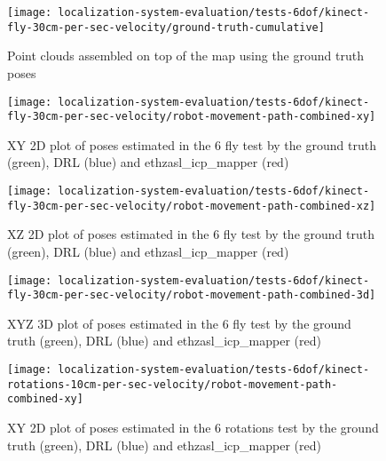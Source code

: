\begin{figure}[H]
	\centering
	\texttt{[image: localization-system-evaluation/tests-6dof/kinect-fly-30cm-per-sec-velocity/ground-truth-cumulative]}
	\caption{Point clouds assembled on top of the map using the ground truth poses}
	\label{fig:localization-system-evaluation_kinect-fly-30cm-per-sec-velocity-gt-cumulative}
\end{figure}


\begin{figure}[H]
	\centering
	\texttt{[image: localization-system-evaluation/tests-6dof/kinect-fly-30cm-per-sec-velocity/robot-movement-path-combined-xy]}
	\caption{XY 2D plot of poses estimated in the 6  fly test by the ground truth (green), DRL (blue) and ethzasl\_icp\_mapper (red)}
	\label{fig:localization-system-evaluation_kinect-fly-robot-movement-path-combined-xy}
\end{figure}

\begin{figure}[H]
	\centering
	\hspace*{0.25cm}\texttt{[image: localization-system-evaluation/tests-6dof/kinect-fly-30cm-per-sec-velocity/robot-movement-path-combined-xz]}
	\caption{XZ 2D plot of poses estimated in the 6  fly test by the ground truth (green), DRL (blue) and ethzasl\_icp\_mapper (red)}
	\label{fig:localization-system-evaluation_kinect-fly-robot-movement-path-combined-xz}
\end{figure}

\begin{figure}[H]
	\centering
	\texttt{[image: localization-system-evaluation/tests-6dof/kinect-fly-30cm-per-sec-velocity/robot-movement-path-combined-3d]}
	\caption{XYZ 3D plot of poses estimated in the 6  fly test by the ground truth (green), DRL (blue) and ethzasl\_icp\_mapper (red)}
	\label{fig:localization-system-evaluation_kinect-fly-robot-movement-path-combined-3d}
\end{figure}


\begin{figure}[H]
	\centering
	\texttt{[image: localization-system-evaluation/tests-6dof/kinect-rotations-10cm-per-sec-velocity/robot-movement-path-combined-xy]}
	\caption{XY 2D plot of poses estimated in the 6  rotations test by the ground truth (green), DRL (blue) and ethzasl\_icp\_mapper (red)}
	\label{fig:localization-system-evaluation_kinect-rotations-robot-movement-path-combined-xy}
\end{figure}

